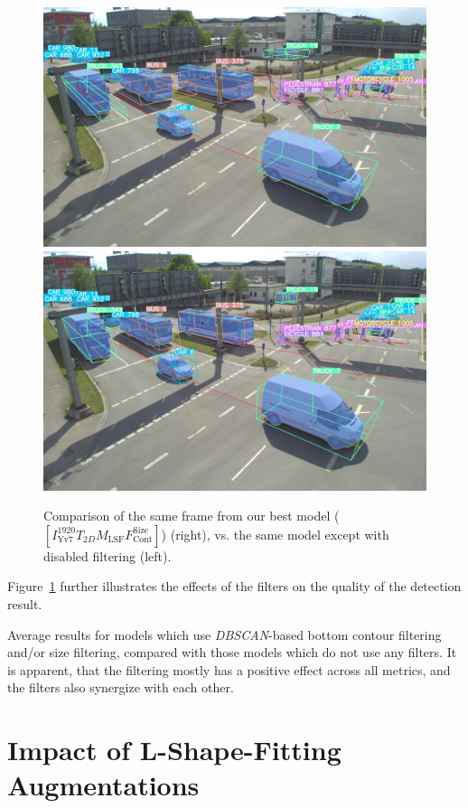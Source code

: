\begin{figure}[htb]
    \includegraphics[width=0.499\linewidth]{
        figures/selection/1651673054.274505919.s110.camera.basler.south2.8mm.nofilter}
    \includegraphics[width=0.499\linewidth]{
        figures/selection/1651673054.274505919.s110.camera.basler.south2.8mm}
    \caption{Comparison of the same frame from our best model ($\left[I^{1920}_\text{Yv7}T_{2D}M_\text{LSF}F_\text{Cont}^\text{Size}\right]$) (right), vs. the same model except with disabled filtering (left). }
    \label{fig:compare-without-filter}
\end{figure}

Figure~\ref{fig:compare-without-filter} further illustrates the effects of the filters on the quality of the detection result.

\begin{table}[htbp]
    
    \caption{Average results for models which use \textit{DBSCAN}-based bottom contour filtering and/or size filtering, compared with those models which do not use any filters. It is apparent, that the filtering mostly has a positive effect across all metrics, and the filters also synergize with each other.}
    \label{tbl:filter-results}
\end{table}

\newpage


\section{Impact of L-Shape-Fitting Augmentations}
\label{sec:lsf-aug-impact}


